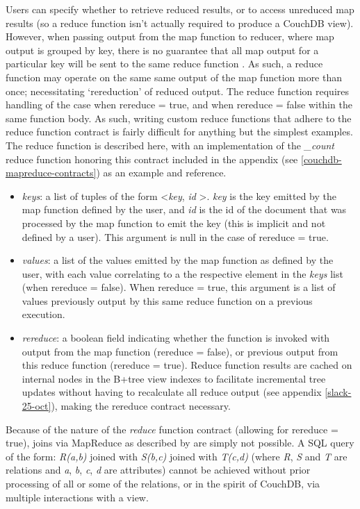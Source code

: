 Users can specify whether to retrieve reduced results, or to access unreduced map results (so a reduce function isn't actually required to produce a CouchDB view). However, when passing output from the map function to reducer, where map output is grouped by key, there is no guarantee that all map output for a particular key will be sent to the same reduce function \cite{reduceFunctions}. As such, a reduce function may operate on the same same output of the map function more than once; necessitating `rereduction' of reduced output. The reduce function requires handling of the case when rereduce = true, and when rereduce = false within the same function body. As such, writing custom reduce functions that adhere to the reduce function contract is fairly difficult for anything but the simplest examples. The reduce function is described here, with an implementation of the \textit{\_count} reduce function honoring this contract included in the appendix (see \ref{couchdb-mapreduce-contracts}) as an example and reference.

\begin{itemize}
    \item \textit{keys}: a list of tuples of the form \textless \textit{key}, \textit{id} \textgreater. \textit{key} is the key emitted by the map function defined by the user, and \textit{id} is the id of the document that was processed by the map function to emit the key (this is implicit and not defined by a user). This argument is null in the case of rereduce = true.
    \item \textit{values}: a list of the values emitted by the map function as defined by the user, with each value correlating to a the respective element in the \textit{keys} list (when rereduce = false). When rereduce = true, this argument is a list of values previously output by this same reduce function on a previous execution.
    \item \textit{rereduce}: a boolean field indicating whether the function is invoked with output from the map function (rereduce = false), or previous output from this reduce function (rereduce = true). Reduce function results are cached on internal nodes in the B+tree view indexes to facilitate incremental tree updates without having to recalculate all reduce output (see appendix \ref{slack-25-oct}), making the rereduce contract necessary.
\end{itemize}

Because of the nature of the \textit{reduce} function contract (allowing for rereduce = true), joins via MapReduce as described by \cite{chandar2010} are simply not possible. A SQL query of the form: \textit{R(a,b)} joined with \textit{S(b,c)} joined with \textit{T(c,d)} (where \textit{R}, \textit{S} and \textit{T} are relations and \textit{a}, \textit{b}, \textit{c}, \textit{d} are attributes) cannot be achieved without prior processing of all or some of the relations, or in the spirit of CouchDB, via multiple interactions with a view.

